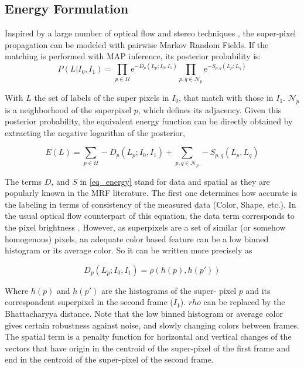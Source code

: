 \subsection{Energy Formulation}

Inspired by a large number of optical flow and stereo
techniques \cite{c7}\cite{c12}\cite{c13}, the super-pixel propagation can be
modeled with pairwise Markov Random Fields. If
the matching is performed with MAP inference, its
posterior probability is: 
\begin{equation}
 P(L|I_0,I_1) = \displaystyle \prod_{p \in \Omega} \mathrm{e}^{-D_p(L_p;I_0,I_1)} 
\prod_{p,q \in \mathcal{N}_p} \mathrm{e}^{-S_{p,q}(L_p;L_q)} 
\label{eq_prob}
\end{equation}

With $L$ the set of labels of the super pixels in $I_0$,
that match with those in $I_1$.
$ \mathcal{N}_p $ is a neighborhood of the
superpixel $p$, which defines its adjacency. Given this posterior probability,
the equivalent energy function can be directly obtained
by extracting the negative logarithm of the posterior,

\begin{equation}
E(L) = \displaystyle \sum_{p \in \Omega} -D_p(L_p;I_0,I_1) +
\sum_{p,q \in \mathcal{N}_p} -S_{p,q}(L_p,L_q)
\label{eq_energy}
\end{equation}

The terms $D$, and $S$ in \ref{eq_energy} stand for data and spatial as they
are popularly known in the MRF literature. The first
one determines how accurate is the labeling in terms
of consistency of the measured data (Color, Shape,
etc.). In the usual optical flow counterpart of this equation,
the data term corresponds to the pixel
brightness \cite{c7}\cite{c5}. However, as superpixels are a set
of similar (or somehow homogenous) pixels, an
adequate color based feature can be a low binned
histogram or its average color. So it can be written 
more precisely as

\begin{equation}
D_p(L_p;I_0,I_1) = \rho(h(p),h(p'))
\label{eq_Dp}
\end{equation}

Where $h(p)$ and $h(p')$ are the histograms of the super-
pixel $p$ and its correspondent superpixel in the
second frame ($I_1$). $rho$ can be replaced by the Bhattacharyya
 distance. Note that the low binned histogram or
average color gives certain robustness against noise,
and slowly changing colors between frames.
The spatial term is a penalty function for horizontal
and vertical changes of the vectors that have origin in
the centroid of the super-pixel of the first frame and
end in the centroid of the super-pixel of the second
frame.

